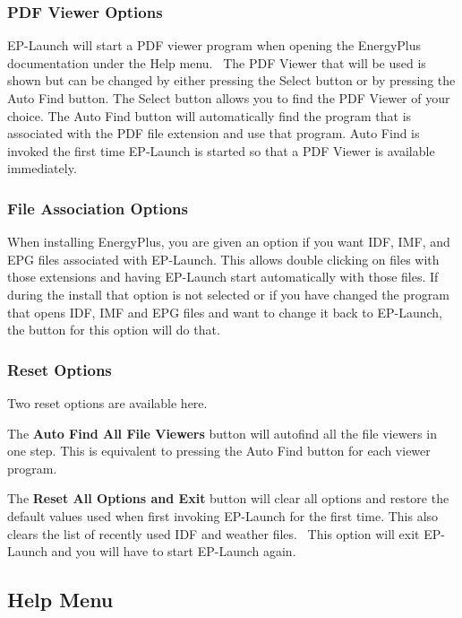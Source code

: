 \subsubsection{PDF Viewer Options}\label{pdf-viewer-options}

EP-Launch will start a PDF viewer program when opening the EnergyPlus documentation under the Help menu.~ The PDF Viewer that will be used is shown but can be changed by either pressing the Select button or by pressing the Auto Find button. The Select button allows you to find the PDF Viewer of your choice. The Auto Find button will automatically find the program that is associated with the PDF file extension and use that program. Auto Find is invoked the first time EP-Launch is started so that a PDF Viewer is available immediately.

\subsubsection{File Association Options}\label{file-association-options}

When installing EnergyPlus, you are given an option if you want IDF, IMF, and EPG files associated with EP-Launch. This allows double clicking on files with those extensions and having EP-Launch start automatically with those files. If during the install that option is not selected or if you have changed the program that opens IDF, IMF and EPG files and want to change it back to EP-Launch, the button for this option will do that.

\subsubsection{Reset Options}\label{reset-options}

Two reset options are available here.

The \textbf{Auto Find All File Viewers} button will autofind all the file viewers in one step. This is equivalent to pressing the Auto Find button for each viewer program.

The \textbf{Reset All Options and Exit} button will clear all options and restore the default values used when first invoking EP-Launch for the first time. This also clears the list of recently used IDF and weather files.~ This option will exit EP-Launch and you will have to start EP-Launch again.

\subsection{Help Menu}\label{help-menu}

